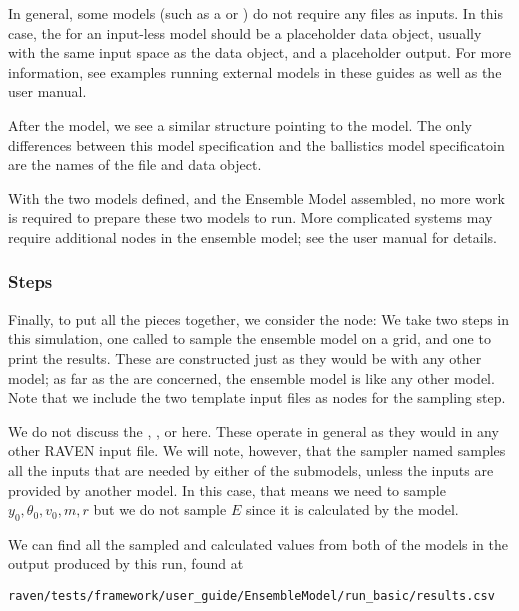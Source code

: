 In general, some models (such as a  or ) do not require any files as
inputs.  In this case, the  for an input-less model should be a placeholder data object,
usually with the same input space as the  data object, and a placeholder output.
For more information, see examples running external models in these guides as well as the user manual.

After the  model, we see a similar structure pointing to the  model.
The only differences between this model specification and the ballistics model specificatoin are the names of
the  file and  data object.

With the two models defined, and the Ensemble Model assembled, no more work is required to
prepare these two models to run.  More complicated systems may require additional nodes in the ensemble model;
see the user manual for details.

\subsubsection{Steps}
Finally, to put all the pieces together, we consider the  node:
We take two steps in this simulation, one  called  to sample the ensemble model on a grid,
and one  to print the results.  These are constructed just as they would be with any other
model; as far as the  are concerned, the ensemble model is like any other model.  Note that we
include the two template input files as  nodes for the sampling step.

We do not discuss the , , or 
here.  These operate in general as they would in any other RAVEN input file.  We will note, however, that the
 sampler named  samples all the inputs that are needed by either of the submodels,
unless the inputs are provided by another model.  In this case, that means we need to sample
$y_0,\theta_0,v_0,m,r$ but we do not sample $E$ since it is calculated by the  model.

We can find all the sampled and calculated values from both of the models in the output produced by this run,
found at
\begin{verbatim}
raven/tests/framework/user_guide/EnsembleModel/run_basic/results.csv
\end{verbatim}



